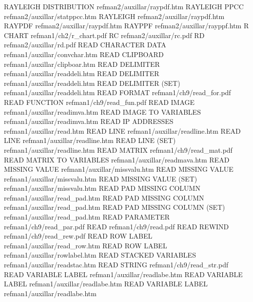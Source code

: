 RAYLEIGH DISTRIBUTION                   refman2/auxillar/raypdf.htm
RAYLEIGH PPCC                           refman2/auxillar/statppcc.htm
RAYLEIGH                                refman2/auxillar/raypdf.htm
RAYPDF                                  refman2/auxillar/raypdf.htm
RAYPPF                                  refman2/auxillar/rayppf.htm
R CHART                                 refman1/ch2/r_chart.pdf
RC                                      refman2/auxillar/rc.pdf
RD                                      refman2/auxillar/rd.pdf
READ CHARACTER DATA                     refman1/auxillar/convchar.htm
READ CLIPBOARD                          refman1/auxillar/clipboar.htm
READ DELIMITER                          refman1/auxillar/readdeli.htm
READ DELIMITER                          refman1/auxillar/readdeli.htm
READ DELIMITER (SET)                    refman1/auxillar/readdeli.htm
READ FORMAT                             refman1/ch9/read_for.pdf
READ FUNCTION                           refman1/ch9/read_fun.pdf
READ IMAGE                              refman1/auxillar/readimva.htm
READ IMAGE TO VARIABLES                 refman1/auxillar/readimva.htm
READ IP ADDRESSES                       refman1/auxillar/read.htm
READ LINE                               refman1/auxillar/readline.htm
READ LINE                               refman1/auxillar/readline.htm
READ LINE (SET)                         refman1/auxillar/readline.htm
READ MATRIX                             refman1/ch9/read_mat.pdf
READ MATRIX TO VARIABLES                refman1/auxillar/readmava.htm
READ MISSING VALUE                      refman1/auxillar/missvalu.htm
READ MISSING VALUE                      refman1/auxillar/missvalu.htm
READ MISSING VALUE (SET)                refman1/auxillar/missvalu.htm
READ PAD MISSING COLUMN                 refman1/auxillar/read_pad.htm
READ PAD MISSING COLUMN                 refman1/auxillar/read_pad.htm
READ PAD MISSING COLUMN (SET)           refman1/auxillar/read_pad.htm
READ PARAMETER                          refman1/ch9/read_par.pdf
READ                                    refman1/ch9/read.pdf
READ REWIND                             refman1/ch9/read_rew.pdf
READ ROW LABEL                          refman1/auxillar/read_row.htm
READ ROW LABEL                          refman1/auxillar/rowlabel.htm
READ STACKED VARIABLES                  refman1/auxillar/readstac.htm
READ STRING                             refman1/ch9/read_str.pdf
READ VARIABLE LABEL                     refman1/auxillar/readlabe.htm
READ VARIABLE LABEL                     refman1/auxillar/readlabe.htm
READ VARIABLE LABEL                     refman1/auxillar/readlabe.htm
